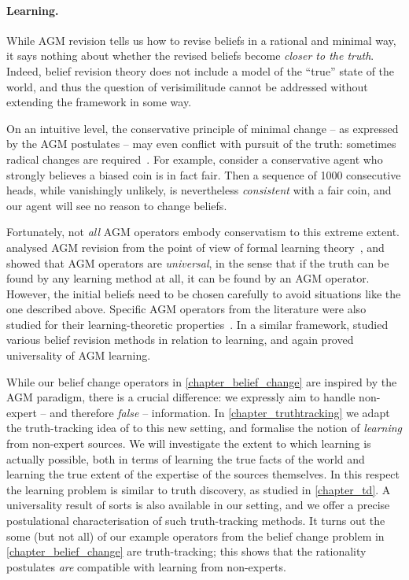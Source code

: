 {\paragraph{Learning.}

While AGM revision tells us how to revise beliefs in a rational and minimal
way, it says nothing about whether the revised beliefs become \emph{closer to
the truth}. Indeed, belief revision theory does not include a model of the
``true'' state of the world, and thus the question of verisimilitude cannot be
addressed without extending the framework in some way.

On an intuitive level, the conservative principle of minimal change -- as
expressed by the AGM postulates -- may even conflict with pursuit of the truth:
sometimes radical changes are required~\cite{kelly1997reliable}. For example,
consider a conservative agent who strongly believes a biased coin is in fact
fair. Then a sequence of 1000 consecutive heads, while vanishingly unlikely, is
nevertheless \emph{consistent} with a fair coin, and our agent will see no
reason to change beliefs.

Fortunately, not \emph{all} AGM operators embody conservatism to this extreme
extent. \textcite{kelly1997reliable} analysed AGM revision from the point of
view of formal learning
theory~\cites{jain1999systems}[]{gierasimczuk2010knowing},
and showed that AGM operators are \emph{universal}, in the sense that if the
truth can be found by any learning method at all, it can be found by an AGM
operator. However, the initial beliefs need to be chosen carefully to avoid
situations like the one described above. Specific AGM operators from the
literature were also studied for their learning-theoretic
properties~\cite{kelly1998learning,Kelly_1999}. In a similar framework,
\textcite{gierasimczuk2010knowing,baltag_tt_2019,Baltag_2016} studied various
belief revision methods in relation to learning, and again proved universality
of AGM learning.

While our belief change operators in \cref{chapter_belief_change} are inspired
by the AGM paradigm, there is a crucial difference: we expressly aim to handle
non-expert -- and therefore \emph{false} -- information. In
\cref{chapter_truthtracking} we adapt the truth-tracking idea of
\textcite{baltag_tt_2019} to this new setting, and formalise the notion of
\emph{learning} from non-expert sources. We will investigate the extent to
which learning is actually possible, both in terms of learning the true facts
of the world and learning the true extent of the expertise of the sources
themselves. In this respect the learning problem is similar to truth discovery,
as studied in \cref{chapter_td}. A universality result of sorts is also
available in our setting, and we offer a precise postulational characterisation
of such truth-tracking methods. It turns out the some (but not all) of our
example operators from the belief change problem in
\cref{chapter_belief_change} are truth-tracking; this shows that the
rationality postulates \emph{are} compatible with learning from non-experts.

}


